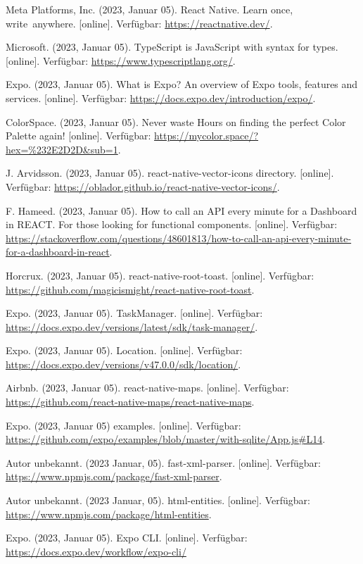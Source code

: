 \documentclass[12pt,oneside]{report}
\begin{document}
  \begin{thebibliography}{10}
  	 Meta Platforms, Inc. (2023, Januar 05). React Native. Learn once, write anywhere. [online]. Verfügbar: \url{https://reactnative.dev/}.
  	
  	 Microsoft. (2023, Januar 05). TypeScript is JavaScript with syntax for types. [online]. Verfügbar: \url{https://www.typescriptlang.org/}.
  	
  	 Expo. (2023, Januar 05). What is Expo? An overview of Expo tools, features and services. [online]. Verfügbar: \url{https://docs.expo.dev/introduction/expo/}.
  	
  	 ColorSpace. (2023, Januar 05). Never waste Hours on finding the perfect Color Palette again! [online]. Verfügbar: \url{https://mycolor.space/?hex=%232E2D2D&sub=1}.
  	
  	 J. Arvidsson. (2023, Januar 05). react-native-vector-icons directory. [online]. Verfügbar: \url{https://oblador.github.io/react-native-vector-icons/}.
  	
	 F. Hameed. (2023, Januar 05). How to call an API every minute for a Dashboard in REACT. For those looking for functional components. [online]. Verfügbar: \url{https://stackoverflow.com/questions/48601813/how-to-call-an-api-every-minute-for-a-dashboard-in-react}.
	
	 Horcrux. (2023, Januar 05). react-native-root-toast. [online]. Verfügbar: \url{https://github.com/magicismight/react-native-root-toast}.
	
	 Expo. (2023, Januar 05). TaskManager. [online]. Verfügbar: \url{https://docs.expo.dev/versions/latest/sdk/task-manager/}.
	
	 Expo. (2023, Januar 05). Location. [online]. Verfügbar: \url{https://docs.expo.dev/versions/v47.0.0/sdk/location/}.
	
	 Airbnb. (2023, Januar 05). react-native-maps. [online]. Verfügbar: \url{https://github.com/react-native-maps/react-native-maps}.
	
	 Expo. (2023, Januar 05) examples. [online]. Verfügbar: \url{https://github.com/expo/examples/blob/master/with-sqlite/App.js#L14}.
	
	 Autor unbekannt. (2023 Januar, 05). fast-xml-parser. [online]. Verfügbar: \url{https://www.npmjs.com/package/fast-xml-parser}.
	
	 Autor unbekannt. (2023 Januar, 05). html-entities. [online]. Verfügbar: \url{https://www.npmjs.com/package/html-entities}.
	
	 Expo. (2023, Januar 05). Expo CLI. [online]. Verfügbar: \url{https://docs.expo.dev/workflow/expo-cli/}
  \end{thebibliography}
  \newpage
  
  \listoffigures
  \newpage
  \renewcommand{\lstlistlistingname}{Listingverzeichnis}
  \lstlistoflistings
\end{document}
